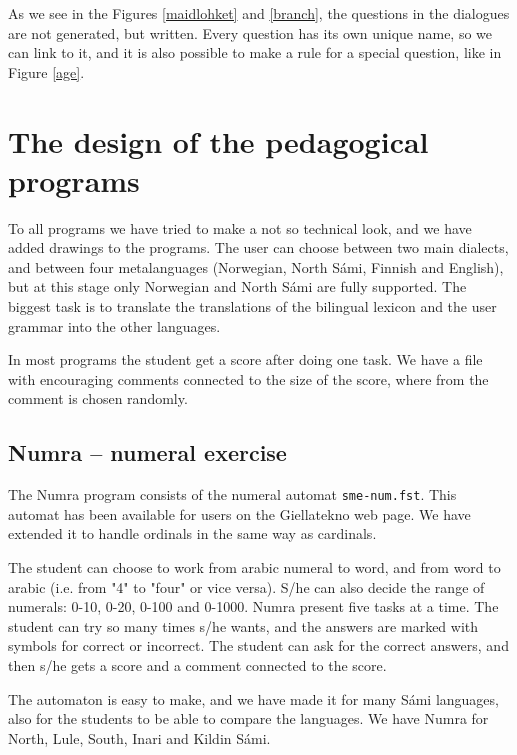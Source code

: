 \documentclass[a4paper,12pt]{article}
\begin{document}
As we see in the Figures \ref{maidlohket} and \ref{branch}, the questions in the dialogues are not generated, but written. Every question has its own unique name, so we can link to it, and it is also possible to make a rule for a special question, like in Figure \ref{age}.  

\section{The design of the pedagogical programs}
To all programs we have tried to make a not so technical look, and we have added drawings to the programs. The user can choose between two main dialects, and between four metalanguages (Norwegian, North Sámi, Finnish and English), but at this stage only Norwegian and North Sámi are fully supported. The biggest task is to translate the translations of the bilingual lexicon and the user grammar into the other languages.  

In most programs the student get a score after doing one task. We have a file with encouraging comments connected to the size of the score, where from the comment is chosen randomly.


\subsection{Numra -- numeral exercise}
The Numra program consists of the numeral automat \texttt{sme-num.fst}. This automat has been available for users on the Giellatekno web page. We have extended it to handle ordinals in the same way as cardinals.  

The student can choose to work from arabic numeral to word, and from word to arabic (i.e. from "4" to "four" or vice versa). S/he can also decide the range of numerals: 0-10, 0-20, 0-100 and 0-1000. Numra present five tasks at a time. The student can try so many times s/he wants, and the answers are marked with symbols for correct or incorrect. The student can ask for the correct answers, and then s/he gets a score and a comment connected to the score.

The automaton is easy to make, and we have made it for many Sámi languages, also for the students to be able to compare the languages. We have Numra for North, Lule, South, Inari and Kildin Sámi.\\ 
\end{document}
